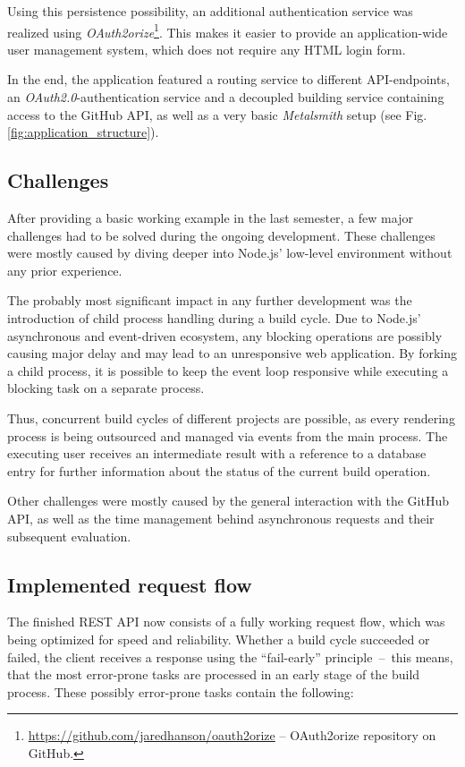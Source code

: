 \documentclass[a4paper,english,11pt]{report}
\begin{document}
Using this persistence possibility, an additional authentication service was realized using \emph{OAuth2orize}\footnote{\url{https://github.com/jaredhanson/oauth2orize} -- OAuth2orize repository on GitHub.}. This makes it easier to provide an application-wide user management system, which does not require any HTML login form.

In the end, the application featured a routing service to different API-endpoints, an \emph{OAuth2.0}-authentication service and a decoupled building service containing access to the GitHub API, as well as a very basic \emph{Metalsmith} setup (see Fig. \ref{fig:application_structure}).

\subsection{Challenges}
After providing a basic working example in the last semester, a few major challenges had to be solved during the ongoing development. These challenges were mostly caused by diving deeper into Node.js' low-level environment without any prior experience.

The probably most significant impact in any further development was the introduction of child process handling during a build cycle. Due to Node.js' asynchronous and event-driven ecosystem, any blocking operations are possibly causing major delay and may lead to an unresponsive web application. By forking a child process, it is possible to keep the event loop responsive while executing a blocking task on a separate process.

Thus, concurrent build cycles of different projects are possible, as every rendering process is being outsourced and managed via events from the main process. The executing user receives an intermediate result with a reference to a database entry for further information about the status of the current build operation.

Other challenges were mostly caused by the general interaction with the GitHub API, as well as the time management behind asynchronous requests and their subsequent evaluation.

\subsection{Implemented request flow}
The finished REST API now consists of a fully working request flow, which was being optimized for speed and reliability. Whether a build cycle succeeded or failed, the client receives a response using the ``fail-early'' principle~--~this means, that the most error-prone tasks are processed in an early stage of the build process. These possibly error-prone tasks contain the following:
\end{document}
